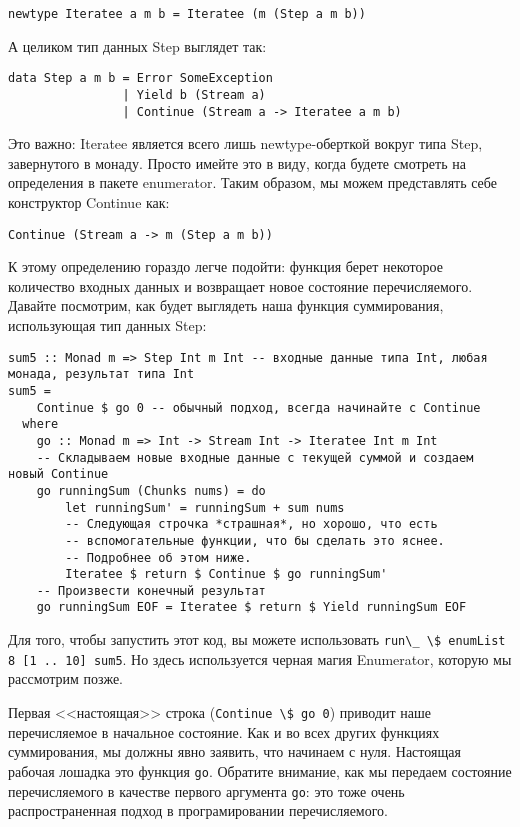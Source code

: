 \begin{lstlisting}
newtype Iteratee a m b = Iteratee (m (Step a m b))
\end{lstlisting}

А целиком тип данных Step выглядет так:

\begin{lstlisting}
data Step a m b = Error SomeException 
                | Yield b (Stream a) 
                | Continue (Stream a -> Iteratee a m b)
\end{lstlisting}

Это важно: Iteratee является всего лишь newtype-оберткой вокруг типа Step, завернутого в монаду. Просто имейте это в виду, когда будете смотреть на определения в пакете enumerator. Таким образом, мы можем представлять себе конструктор Continue как:

\begin{lstlisting}
Continue (Stream a -> m (Step a m b))
\end{lstlisting}

К этому определению гораздо легче подойти: функция берет некоторое количество входных данных и возвращает новое состояние перечисляемого. Давайте посмотрим, как будет выглядеть наша функция суммирования, использующая тип данных Step:

\begin{lstlisting}
sum5 :: Monad m => Step Int m Int -- входные данные типа Int, любая монада, результат типа Int
sum5 =
    Continue $ go 0 -- обычный подход, всегда начинайте с Continue
  where
    go :: Monad m => Int -> Stream Int -> Iteratee Int m Int
    -- Складываем новые входные данные с текущей суммой и создаем новый Continue
    go runningSum (Chunks nums) = do
        let runningSum' = runningSum + sum nums
        -- Следующая строчка *страшная*, но хорошо, что есть 
        -- вспомогательные функции, что бы сделать это яснее.
        -- Подробнее об этом ниже.
        Iteratee $ return $ Continue $ go runningSum'
    -- Произвести конечный результат
    go runningSum EOF = Iteratee $ return $ Yield runningSum EOF
\end{lstlisting}%

\begin{remark}
Для того, чтобы запустить этот код, вы можете использовать \lstinline'run\_ \$ enumList 8 [1 .. 10] sum5'. Но здесь используется черная магия Enumerator, которую мы рассмотрим позже.
\end{remark}

Первая <<настоящая>> строка (\lstinline'Continue \$ go 0') приводит наше перечисляемое в начальное состояние. Как и во всех других функциях суммирования, мы должны явно заявить, что начинаем с нуля. Настоящая рабочая лошадка это функция \lstinline'go'. Обратите внимание, как мы передаем состояние перечисляемого в качестве первого аргумента \lstinline'go': это тоже очень распространенная подход в програмировании перечисляемого.

